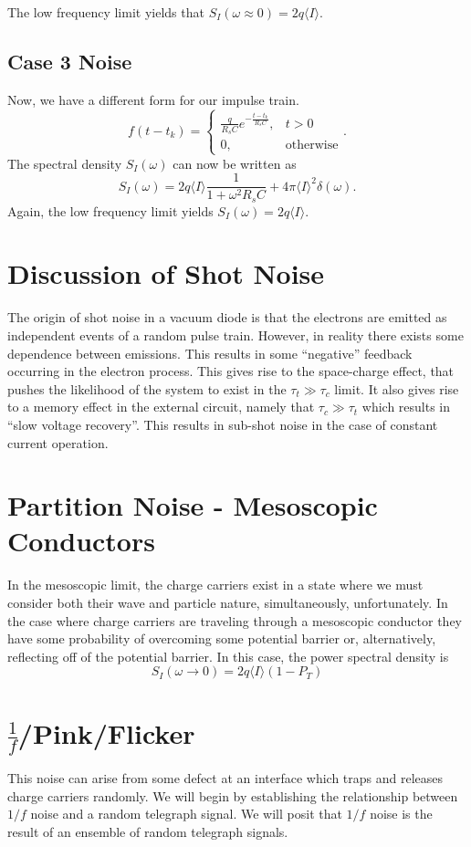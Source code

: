 \documentclass{article}
\begin{document}
The low frequency limit yields that $ S_{I}(\omega \approx 0) = 2 q \langle I
\rangle $.

\subsection{Case 3 Noise}
\label{sub:case_3_noise}
Now, we have a different form for our impulse train.
\[
   f(t-t_{k}) = \begin{cases}
      \frac{q}{R_{s}C} e^{-\frac{t-t_{k}}{R_{s}C}}, & t > 0 \\
      0, & \text{otherwise}
   \end{cases}.
\]
The spectral density $ S_{I}(\omega) $ can now be written as
\[
   S_{I}(\omega) = 2 q \langle I \rangle \frac{1}{1 + \omega^{2} R_{s}C} + 4 \pi
   \langle I \rangle^{2} \delta(\omega).
\]
Again, the low frequency limit yields $ S_{I}(\omega) = 2 q \langle I \rangle $.

\section{Discussion of Shot Noise}
The origin of shot noise in a vacuum diode is that the electrons are emitted as
independent events of a random pulse train. However, in reality there exists
some dependence between emissions. This results in some ``negative'' feedback
occurring in the electron process. This gives rise to the space-charge effect,
that pushes the likelihood of the system to exist in the $ \tau_{t} \gg \tau_{c}
$ limit. It also gives rise to a memory effect in the external circuit, namely
that $ \tau_{c} \gg \tau_{t} $ which results in ``slow voltage recovery''. This
results in sub-shot noise in the case of constant current operation.

\section{Partition Noise - Mesoscopic Conductors}
In the mesoscopic limit, the charge carriers exist in a state where we must
consider both their wave and particle nature, simultaneously, unfortunately. In
the case where charge carriers are traveling through a mesoscopic conductor they
have some probability of overcoming some potential barrier or, alternatively,
reflecting off of the potential barrier. In this case, the power spectral
density is
\[
   S_{I}(\omega \to 0) = 2q \langle I \rangle \left( 1 - P_{T} \right)
\]

\section{$\frac{1}{f}$/Pink/Flicker}
\label{sec:1_f_pink_flicker}
This noise can arise from some defect at an interface which traps and releases
charge carriers randomly. We will begin by establishing the relationship between
$ 1/f $ noise and a random telegraph signal. We will posit that $ 1/f $ noise is
the result of an ensemble of random telegraph signals.
\end{document}
